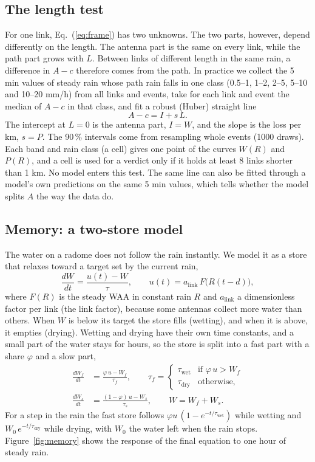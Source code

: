 \documentclass[reprint,aps,pra,amsmath,amssymb,nofootinbib,superscriptaddress]{revtex4-2}
\newcommand{\alink}{a_{\mathrm{link}}}
\newcommand{\twet}{\tau_{\mathrm{wet}}}
\newcommand{\tdry}{\tau_{\mathrm{dry}}}
\begin{document}
\subsection{The length test}
\label{sec:lt}
For one link, Eq.~(\ref{eq:frame}) has two unknowns. The two parts, however, depend differently on the length. The
antenna part is the same on every link, while the path part grows with $L$. Between links of different length in the same
rain, a difference in $A - c$ therefore comes from the path. In practice we collect the 5 min values of steady rain whose
path rain falls in one class (0.5--1, 1--2, 2--5, 5--10 and 10--20 mm/h) from all links and events, take for each link and
event the median of $A - c$ in that class, and fit a robust (Huber) straight line
\begin{equation}
A - c = I + s\,L.
\label{eq:line}
\end{equation}
The intercept at $L = 0$ is the antenna part, $I = W$, and the slope is the loss per km, $s = P$. The 90\,\% intervals come
from resampling whole events (1000 draws). Each band and rain class (a cell) gives one point of the curves $W(R)$ and
$P(R)$, and a cell is used for a verdict only if it holds at least 8 links shorter than 1 km. No model enters this test.
The same line can also be fitted through a model's own predictions on the same 5 min values, which tells whether the model
splits $A$ the way the data do.

\subsection{Memory: a two-store model}
The water on a radome does not follow the rain instantly. We model it as a store that relaxes toward a target set by the
current rain,
\begin{equation}
\frac{dW}{dt} = \frac{u(t) - W}{\tau}, \qquad u(t) = \alink\,F\big(R(t-d)\big),
\label{eq:bucket}
\end{equation}
where $F(R)$ is the steady WAA in constant rain $R$ and $\alink$ a dimensionless factor per link (the link factor),
because some antennas collect more water than others. When $W$ is below its target the store fills (wetting), and when it
is above, it empties (drying). Wetting and drying have their own time constants, and a small part of the water stays for
hours, so the store is split into a fast part with a share $\varphi$ and a slow part,
\begin{align}
\frac{dW_f}{dt} &= \frac{\varphi\,u - W_f}{\tau_f}, \qquad
\tau_f = \begin{cases} \twet & \text{if } \varphi\,u > W_f\\ \tdry & \text{otherwise,}\end{cases}
\label{eq:fast}\\
\frac{dW_s}{dt} &= \frac{(1-\varphi)\,u - W_s}{\tau_s}, \qquad W = W_f + W_s.
\label{eq:slow}
\end{align}
For a step in the rain the fast store follows $\varphi u\,(1 - e^{-t/\twet})$ while wetting and $W_0\,e^{-t/\tdry}$ while
drying, with $W_0$ the water left when the rain stops. Figure~\ref{fig:memory} shows the response of the final equation to
one hour of steady rain.
\end{document}
